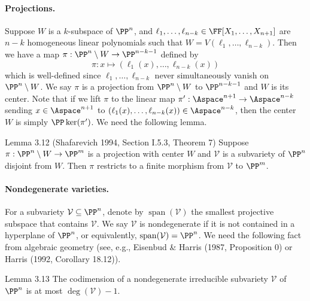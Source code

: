 \paragraph{Projections.}
Suppose $W$ is a $k$-subspace of $\PP^n$, and $\ell_1,\ldots,\ell_{n-k}\in\FF[X_1,\ldots,X_{n+1}]$ are $n-k$ homogeneous linear polynomials such that $W=V(\ell_1,\ldots,\ell_{n-k})$. Then we have a map $\pi:\PP^n\setminus W\to\PP^{n-k-1}$ defined by
\[\pi:x\mapsto(\ell_1(x),\ldots,\ell_{n-k}(x))\]
which is well-defined since $\ell_1,\ldots,\ell_{n-k}$ never simultaneously vanish on $\PP^n\setminus W$. We say $\pi$ is a projection from $\PP^n\setminus W$ to $\PP^{n-k-1}$ and $W$ is its center. Note that if we lift $\pi$ to the linear map $\pi':\Aspace^{n+1}\to\Aspace^{n-k}$ sending $x\in\Aspace^{n+1}$ to $(\ell_1(x),\ldots,\ell_{n-k}(x))\in\Aspace^{n-k}$, then the center $W$ is simply $\PP\ker(\pi')$.
We need the following lemma.
\begin{result}{Lemma 3.12 (Shafarevich 1994, Section I.5.3, Theorem 7)}
Suppose $\pi:\PP^n\setminus W\to\PP^m$ is a projection with center $W$ and $\mathcal V$ is a subvariety of $\PP^n$ disjoint from $W$. Then $\pi$ restricts to a finite morphism from $\mathcal V$ to $\PP^m$.
\end{result}
\paragraph{Nondegenerate varieties.}
For a subvariety $\mathcal V\subseteq\PP^n$, denote by $\operatorname{span}(\mathcal V)$ the smallest projective subspace that contains $\mathcal V$. We say $\mathcal V$ is nondegenerate if it is not contained in a hyperplane of $\PP^n$, or equivalently, $\operatorname{span}(\mathcal V)=\PP^n$.
We need the following fact from algebraic geometry (see, e.g., Eisenbud \& Harris (1987, Proposition 0) or Harris (1992, Corollary 18.12)).
\begin{result}{Lemma 3.13}
The codimension of a nondegenerate irreducible subvariety $\mathcal V$ of $\PP^n$ is at most $\deg(\mathcal V)-1$.
\end{result}
